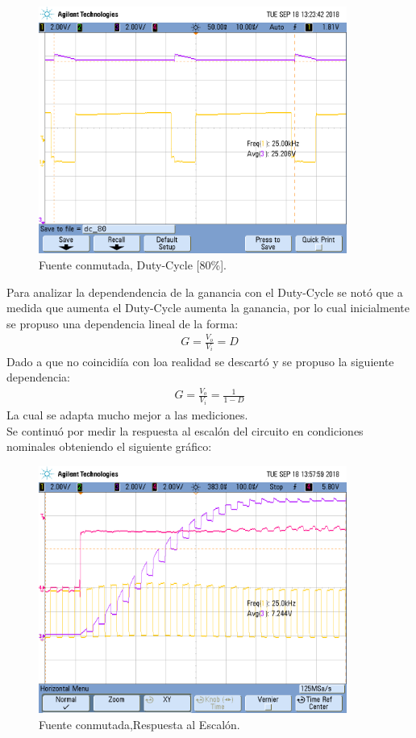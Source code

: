 \begin{figure}[H]
	\centering
	\includegraphics[width=0.9\textwidth]{Imagenes/dc_80.png}
\caption{Fuente conmutada, Duty-Cycle [80\%].}
	\label{fig:fcon}
\end{figure}
Para analizar la dependendencia de la ganancia con el Duty-Cycle se notó que a medida que aumenta el Duty-Cycle aumenta la ganancia, por lo cual inicialmente se propuso una dependencia lineal de la forma:
\begin{align}G = \frac{V_o}{V_i} = D \end{align}
Dado a que no coincidiía con loa realidad se descartó y se propuso la siguiente dependencia:
\begin{align}G = \frac{V_o}{V_i} = \frac{1}{1-D} \end{align}
La cual se adapta mucho mejor a las mediciones.\\
Se continuó por medir la respuesta al escalón del circuito en condiciones nominales obteniendo el siguiente gráfico:
\begin{figure}[H]
	\centering
	\includegraphics[width=0.9\textwidth]{Imagenes/sr.png}
\caption{Fuente conmutada,Respuesta al Escalón.}
	\label{fig:fcon}
\end{figure}
